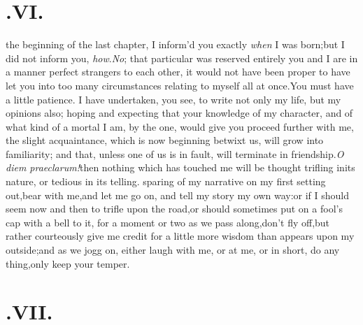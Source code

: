 \documentclass{article}
\begin{document}
\section{.\enspace VI.}

 the beginning of the last chapter,
I inform’d you exactly \textit{when} I was born;\tsk but I did not inform
you, \textit{how}.\break\textit{No}; that particular was reserved entirely 
you and I are in a manner
perfect stran\-gers to each other, it would not have been proper to
have let you into too many circumstances relating to myself all at
once.\tsk You must have a little patience. I have undertaken, you see, to write not only my life,
but my opinions also; hoping and expecting that your knowledge
of my character, and of what kind of a
mortal I am, by the one, would give you
proceed further with me, the slight ac\-quaintance, which is now beginning betwixt us,
will grow into familiarity; and that, unless one of us is in fault, will\break
terminate in friendship.\tsk  \textit{O diem
prae\-clarum!}\tsh  then nothing which has touched me will be
thought trifling in\break its nature, or tedious in its telling.\break
{}
sparing of my narrative on my first setting out,\tsk  bear
with me,\tsk  and let me go on, and tell my story my own
way:\tsh  or if I should seem now and then to trifle upon the
road,\tsk  or should sometimes put on a fool’s cap with a
bell to it, for a moment or two as we pass along,\tsk  don’t
fly off,\tsk  but rather courteously give me credit for a little
more wisdom than appears upon my outside;\tsk  and as we jogg on, either laugh with
me, or at me, or in short, do any thing,\tsk  only keep your temper.

\section{.\enspace VII.}
\end{document}
